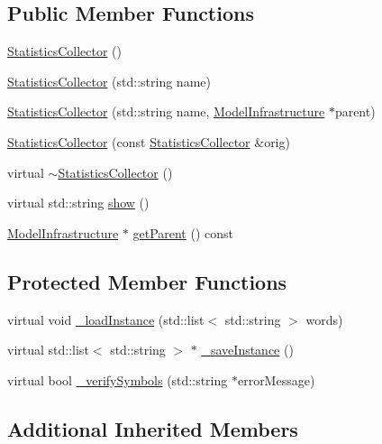 \subsection*{Public Member Functions}
\begin{DoxyCompactItemize}
\item 
\hyperlink{class_statistics_collector_a2129c2bd19f9d64814fbfe18974a6d2e}{Statistics\-Collector} ()
\item 
\hyperlink{class_statistics_collector_acbb20e7e94252ff7105de7b0cdecb7ee}{Statistics\-Collector} (std\-::string name)
\item 
\hyperlink{class_statistics_collector_a9c51fc17337d3c050ff7e650825cccf9}{Statistics\-Collector} (std\-::string name, \hyperlink{class_model_infrastructure}{Model\-Infrastructure} $\ast$parent)
\item 
\hyperlink{class_statistics_collector_a25e8def6d91decdf48d7c0fedb4382dc}{Statistics\-Collector} (const \hyperlink{class_statistics_collector}{Statistics\-Collector} \&orig)
\item 
virtual \hyperlink{class_statistics_collector_aef9244a0c9f715bc19136d283b759c6e}{$\sim$\-Statistics\-Collector} ()
\item 
virtual std\-::string \hyperlink{class_statistics_collector_a7ce8dad7e29d06c73a01d2ddee93fe00}{show} ()
\item 
\hyperlink{class_model_infrastructure}{Model\-Infrastructure} $\ast$ \hyperlink{class_statistics_collector_a8364c0ffd6fa0ffddc6ab2290ef8d184}{get\-Parent} () const 
\end{DoxyCompactItemize}
\subsection*{Protected Member Functions}
\begin{DoxyCompactItemize}
\item 
virtual void \hyperlink{class_statistics_collector_aa13d2bc6d9deeffa9667388ae3e4f962}{\-\_\-load\-Instance} (std\-::list$<$ std\-::string $>$ words)
\item 
virtual std\-::list$<$ std\-::string $>$ $\ast$ \hyperlink{class_statistics_collector_a66eed8e1bd0316588575aa7310ac028b}{\-\_\-save\-Instance} ()
\item 
virtual bool \hyperlink{class_statistics_collector_a5aeefa5028a2b6a0157db55c0dfc7419}{\-\_\-verify\-Symbols} (std\-::string $\ast$error\-Message)
\end{DoxyCompactItemize}
\subsection*{Additional Inherited Members}


